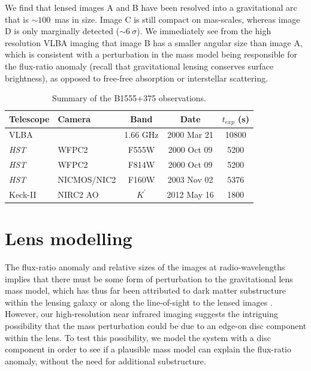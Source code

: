 \documentclass[a4paper,fleqn,usenatbib,useAMS]{mnras}
\begin{document}
We find that lensed images A and B have been resolved into a gravitational arc that is $\sim100$~mas in size. Image C is still compact on mas-scales, whereas image D is only marginally detected ($\sim6~\sigma$). We immediately see from the high resolution VLBA imaging that image B has a smaller angular size than image A, which is consistent with a perturbation in the mass model being responsible for the flux-ratio anomaly (recall that gravitational lensing conserves surface brightness), as opposed to free-free absorption or interstellar scattering.

\begin{table}
\centering
\caption{Summary of the B1555+375 observations.}
\begin{tabular}{llccc}
\hline
Telescope		& Camera			&  Band 		& Date				&$t_{exp}$ (s) \\
\hline
VLBA			&					& 1.66 GHz	& 	2000 Mar 21	& 10800\\
\textit{HST}	& WFPC2    		& F555W		&	2000 Oct 09	& 5200\\
\textit{HST}	& WFPC2    		& F814W		&	2000 Oct 09 	& 5200\\
\textit{HST}	& NICMOS/NIC2	& F160W		&	2003 Nov 02	& 5376\\
Keck-II			& NIRC2 AO		& $K^\prime$	& 	2012 May 16	& 1800\\
\hline
\end{tabular}
\label{tab:obs}
\end{table}

\section{Lens modelling}

The flux-ratio anomaly and relative sizes of the images at radio-wavelengths implies that there must be some form of perturbation to the gravitational lens mass model, which has thus far been attributed to dark matter substructure within the lensing galaxy or along the line-of-sight to the lensed images \citep{Dalal2002,Xu12,Xu15}. However, our high-resolution near infrared imaging suggests the intriguing possibility that the mass perturbation could be due to an edge-on disc component within the lens. To test this possibility, we model the system with a disc component in order to see if a plausible mass model can explain the flux-ratio anomaly, without the need for additional substructure.
\end{document}

